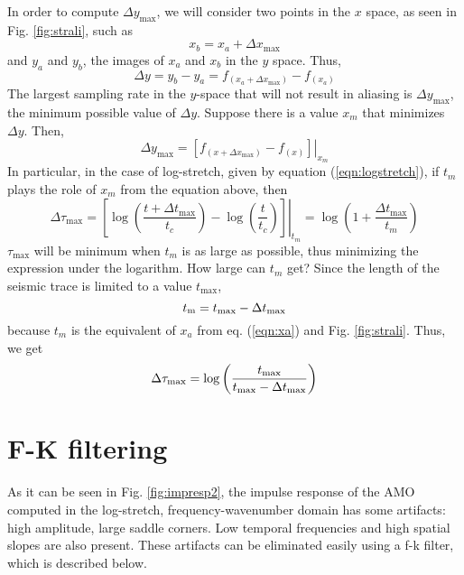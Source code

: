 In order to compute $\Delta y_{\max }$, we will consider two points in the $x$ space, as seen in Fig. \ref{fig:strali}, such as
\begin{equation}
\label{eqn:xa}
x_b  = x_a  + \Delta x_{\max } 
\end{equation}
and $y_a$ and $y_b$, the images of  $x_a$ and $x_b$ in the $y$ space. Thus,
\[
\Delta y = y_b  - y_a  = f_{(x_a  + \Delta x_{\max } )}  - f_{(x_a )} 
\]
The largest sampling rate in the $y$-space that will not result in aliasing is $\Delta y_{\max }$, the minimum possible value of $\Delta y$. Suppose there is a value $x_m$ that minimizes $\Delta y$. Then,
\[
\Delta y_{\max }  = \left. {\left[ {f_{(x + \Delta x_{\max } )}  - f_{(x)} } \right]} \right|_{x_m } 
\]
In particular, in the case of log-stretch, given by equation (\ref{eqn:logstretch}), if $t_m$ plays the role of $x_m$ from the equation above, then
\begin{equation}
\label{eqn:tempojunk}
\Delta \tau _{\max }  = \left. {\left[ {\log \left( {\frac{{t + \Delta t_{\max } }}{{t_c }}} \right) - \log \left( {\frac{t}{{t_c }}} \right)} \right]} \right|_{t_m }  = \log \left( {1 + \frac{{\Delta t_{\max } }}{{t_m }}} \right)
\end{equation}
$\tau_{\max }$ will be minimum when $t_m$ is as large as possible,
thus minimizing the expression under the logarithm. How large can $t_m$ get? Since the length of the seismic trace is limited to a value $t_{\max }$, 
\[
t_{\mathop{\rm m}\nolimits}   = t_{\max }  - \Delta t_{\max } 
\]
because $t_m$ is the equivalent of $x_a$ from eq. (\ref{eqn:xa}) and Fig. \ref{fig:strali}. Thus, we get
\begin{equation}
\label{eqn:deltataumax}
\Delta \tau _{{\rm max}}  = \log \left( {\frac{{t_{\max } }}{{t_{\max }  - \Delta t_{\max } }}} \right)
\end{equation}

\section{F-K filtering}
As it can be seen in Fig. \ref{fig:impresp2}, the impulse response of
the AMO computed in the log-stretch, frequency-wavenumber domain has
some artifacts: high amplitude, large saddle corners. Low temporal
frequencies and high spatial slopes are also present. These artifacts can be eliminated easily
using a f-k filter, which is described below.

